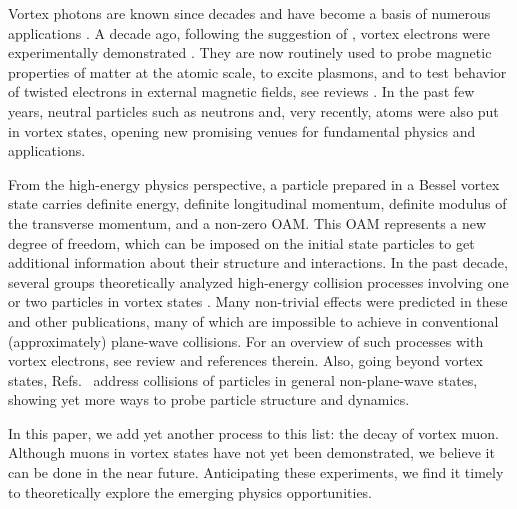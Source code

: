 \documentclass[aps,prd,longbibliography,nofootinbib,amsthm,amsmath,amssymb,amsfonts,notitlepage]{revtex4-1}
\begin{document}
Vortex photons are known since decades \cite{Allen:1992zz,Molina-Terriza:2007,Harris:2015,Paggett:2017,Knyazev:2019}
and have become a basis of numerous applications \cite{Zhan:2009,Torres:2011}.
A decade ago, following the suggestion of \cite{Bliokh:2007ec}, vortex electrons were experimentally demonstrated
\cite{Uchida:2010,Verbeeck:2010,McMorran:2011}.
They are now routinely used to probe magnetic properties of matter at the atomic scale,
to excite plasmons, and to test behavior of twisted electrons in external magnetic fields,
see reviews \cite{Bliokh:2017uvr,Lloyd:2017}.
In the past few years, neutral particles such as neutrons \cite{Clark:2015,Sarenac:2018,Sarenac:2019}
and, very recently, atoms \cite{Luski:2021} were also put in vortex states,
opening new promising venues for fundamental physics and applications.

From the high-energy physics perspective, a particle prepared in a Bessel vortex state
carries definite energy, definite longitudinal momentum, definite modulus of the transverse momentum,
and a non-zero OAM.
This OAM represents a new degree of freedom, which can be imposed on the initial state particles
to get additional information about their structure and interactions.
In the past decade, several groups theoretically analyzed high-energy collision processes involving
one or two particles in vortex states \cite{Jentschura:2010ap,Jentschura:2011ih,Ivanov:2011kk,Ivanov:2012na,Karlovets:2012eu,Hayrapetyan:2014faa,Stock:2015yha,Serbo:2015kia,Ivanov:2016oue,Karlovets:2016jrd,Zaytsev:2017lnr,Karlovets:2017qda,Afanasev:2017jdf,Sherwin:2018dah,Afanasev:2019rlo,Ivanov:2019pdt,Ivanov:2019vxe,Afanasev:2020nur,Sherwin:2020vyq,Afanasev:2021uth,Afanasev:2021fda}.
Many non-trivial effects were predicted in these and other publications,
many of which are impossible to achieve in conventional (approximately) plane-wave collisions.
For an overview of such processes with vortex electrons, see review \cite{Bliokh:2017uvr} and references therein.
Also, going beyond vortex states, Refs.~\cite{Karlovets:2016dva,Karlovets:2016jrd} address collisions of particles in general non-plane-wave states, 
showing yet more ways to probe particle structure and dynamics.

In this paper, we add yet another process to this list: the decay of vortex muon.
Although muons in vortex states have not yet been demonstrated, we believe it can be done in the near future.
Anticipating these experiments, we find it timely to theoretically explore the emerging physics opportunities.
\end{document}
